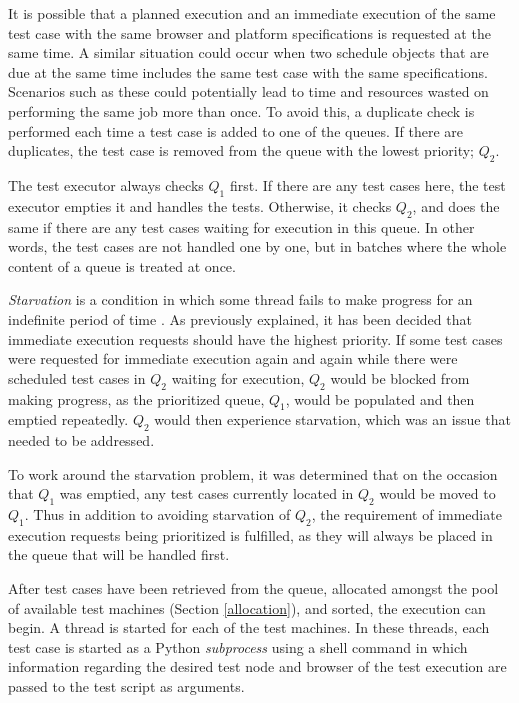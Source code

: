 It is possible that a planned execution and an immediate execution of the same test case with the same browser and platform specifications is requested at the same time. A similar situation could occur when two schedule objects that are due at the same time includes the same test case with the same specifications. Scenarios such as these could potentially lead to time and resources wasted on performing the same job more than once. To avoid this, a duplicate check is performed each time a test case is added to one of the queues. If there are duplicates, the test case is removed from the queue with the lowest priority; $Q_2$.

The test executor always checks $Q_1$ first. If there are any test cases here, the test executor empties it and handles the tests. Otherwise, it checks $Q_2$, and does the same if there are any test cases waiting for execution in this queue. In other words, the test cases are not handled one by one, but in batches where the whole content of a queue is treated at once.

\emph{Starvation} is a condition in which some thread fails to make progress for an indefinite period of time \cite{opsys_boken}. As previously explained, it has been decided that immediate execution requests should have the highest priority. If some test cases were requested for immediate execution again and again while there were scheduled test cases in $Q_2$ waiting for execution, $Q_2$ would be blocked from making progress, as the prioritized queue, $Q_1$, would be populated and then emptied repeatedly. $Q_2$ would then experience starvation, which was an issue that needed to be addressed.

To work around the starvation problem, it was determined that on the occasion that $Q_1$ was emptied, any test cases currently located in $Q_2$ would be moved to $Q_1$. Thus in addition to avoiding starvation of $Q_2$, the requirement of immediate execution requests being prioritized is fulfilled, as they will always be placed in the queue that will be handled first. 

After test cases have been retrieved from the queue, allocated amongst the pool of available test machines (Section \ref{allocation}), and sorted, the execution can begin. A thread is started for each of the test machines. In these threads, each test case is started as a Python \emph{subprocess} using a shell command in which information regarding the desired test node and browser of the test execution are passed to the test script as arguments.

